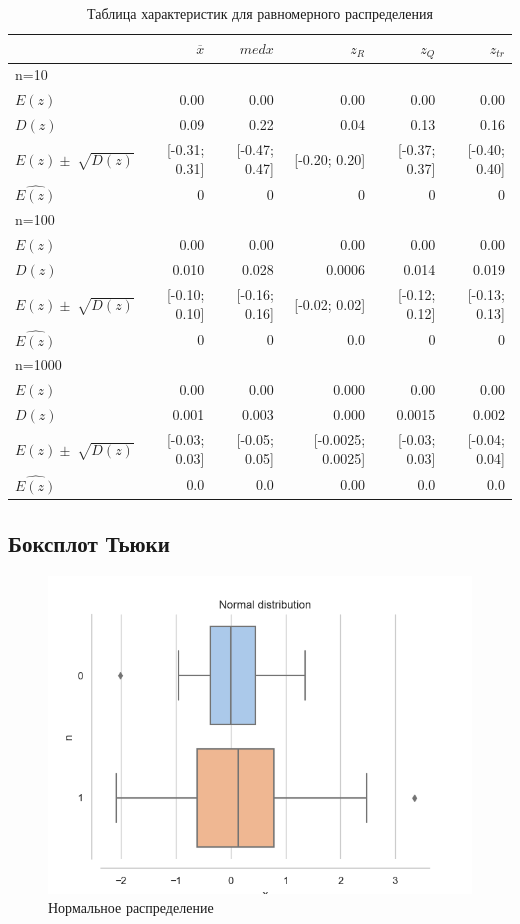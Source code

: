 \documentclass[a4paper,14pt]{article}
\begin{document}
	\begin{table}[H]
		\centering
		\begin{tabular}[t]{|l|r|r|r|r|r|}
			\hline
			& $\overline{x}$ & $med x$ & $z_R$ & $z_Q$ & $z_{tr}$\\\hline\hline
			n=10 & & & & &\\\hline
			$E(z)$ & 0.00 & 0.00 & 0.00 & 0.00 & 0.00\\\hline
			$D(z)$ & 0.09 & 0.22 & 0.04 & 0.13 & 0.16\\\hline
			$E(z)\pm\sqrt[]{D(z)}$ & [-0.31; 0.31] & [-0.47; 0.47] & [-0.20; 0.20] & [-0.37; 0.37] & [-0.40; 0.40]\\\hline
			$\hat{E(z)}$ & 0 & 0 & 0 & 0 &  0\\\hline
			n=100 & & & & &\\\hline
			$E(z)$ & 0.00 & 0.00 & 0.00 & 0.00 & 0.00\\\hline
			$D(z)$ & 0.010 & 0.028 & 0.0006 & 0.014 & 0.019\\\hline
			$E(z)\pm\sqrt[]{D(z)}$ & [-0.10; 0.10] & [-0.16; 0.16] & [-0.02; 0.02] & [-0.12; 0.12] & [-0.13; 0.13] \\\hline
			$\hat{E(z)}$ & 0 & 0 & 0.0 & 0 &  0\\\hline
			n=1000 & & & & &\\\hline
			$E(z)$ & 0.00 & 0.00 & 0.000 & 0.00 & 0.00\\\hline
			$D(z)$ & 0.001 & 0.003 & 0.000 & 0.0015 & 0.002\\\hline
			$E(z)\pm\sqrt[]{D(z)}$ & [-0.03; 0.03] & [-0.05; 0.05] & [-0.0025; 0.0025] & [-0.03; 0.03] & [-0.04; 0.04] \\\hline
			$\hat{E(z)}$ & 0.0 & 0.0 & 0.00 & 0.0 &  0.0\\\hline
		\end{tabular}
		\caption{Таблица характеристик для равномерного распределения}
		\label{tab:uniform}
	\end{table}
	\subsection{Боксплот Тьюки}
	\begin{figure}[H]
		\centering
		\includegraphics[scale=0.6]{../image/lab3/lab3_norm.png}
		\caption{Нормальное распределение}
		\label{fig:normal}
	\end{figure}
	
\end{document}
